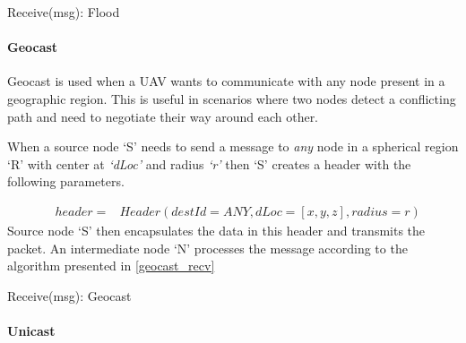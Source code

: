 \begin{algorithm}
\caption{Receive(msg): Flood} 
\label{flood_recv}
\DontPrintSemicolon
{}

\end{algorithm}

\paragraph{Geocast}

Geocast is used when a UAV wants to communicate with any node present in a geographic region. This is useful in scenarios where two nodes detect a conflicting path and need to negotiate their way around each other.  

When a source node `S' needs to send a message to \emph{any} node in a spherical region `R' with center at \emph{`dLoc'} and radius \emph{`r'} then `S' creates a header with the following parameters.

\begin{eqnarray*}
& header = & Header(destId=ANY, dLoc=[x,y,z], radius=r)
\end{eqnarray*}
Source node `S' then encapsulates the data in this header and transmits the packet. An intermediate node `N' processes the message according to the algorithm presented in \ref{geocast_recv}

\begin{algorithm}
\caption{Receive(msg): Geocast} 
\label{geocast_recv}
\DontPrintSemicolon
{}
\end{algorithm}

\paragraph{Unicast}

